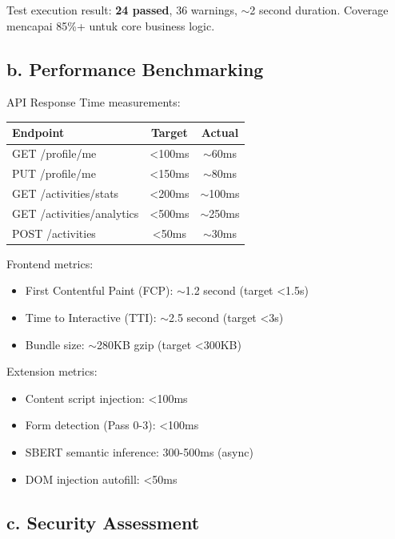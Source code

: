\documentclass[12pt,a4paper]{article}
\begin{document}
Test execution result: \textbf{24 passed}, 36 warnings, $\sim$2 second duration. Coverage mencapai 85\%+ untuk core business logic.

\subsection*{b. Performance Benchmarking}

API Response Time measurements:

\begin{center}
\begin{tabular}{|l|c|c|}
\hline
\textbf{Endpoint} & \textbf{Target} & \textbf{Actual} \\
\hline
GET /profile/me & \textless{}100ms & $\sim$60ms \\
\hline
PUT /profile/me & \textless{}150ms & $\sim$80ms \\
\hline
GET /activities/stats & \textless{}200ms & $\sim$100ms \\
\hline
GET /activities/analytics & \textless{}500ms & $\sim$250ms \\
\hline
POST /activities & \textless{}50ms & $\sim$30ms \\
\hline
\end{tabular}
\end{center}

Frontend metrics:
\begin{itemize}
  \item First Contentful Paint (FCP): $\sim$1.2 second (target \textless{}1.5s)
  \item Time to Interactive (TTI): $\sim$2.5 second (target \textless{}3s)
  \item Bundle size: $\sim$280KB gzip (target \textless{}300KB)
\end{itemize}

Extension metrics:
\begin{itemize}
  \item Content script injection: \textless{}100ms
  \item Form detection (Pass 0-3): \textless{}100ms
  \item SBERT semantic inference: 300-500ms (async)
  \item DOM injection autofill: \textless{}50ms
\end{itemize}

\subsection*{c. Security Assessment}
\end{document}
